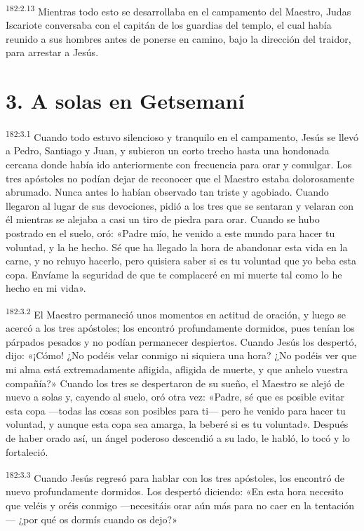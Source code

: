 \par 
\textsuperscript{182:2.13} Mientras todo esto se desarrollaba en el campamento del Maestro, Judas Iscariote conversaba con el capitán de los guardias del templo, el cual había reunido a sus hombres antes de ponerse en camino, bajo la dirección del traidor, para arrestar a Jesús.

\section*{3. A solas en Getsemaní}
\par 
\textsuperscript{182:3.1} Cuando todo estuvo silencioso y tranquilo en el campamento, Jesús se llevó a Pedro, Santiago y Juan, y subieron un corto trecho hasta una hondonada cercana donde había ido anteriormente con frecuencia para orar y comulgar. Los tres apóstoles no podían dejar de reconocer que el Maestro estaba dolorosamente abrumado. Nunca antes lo habían observado tan triste y agobiado. Cuando llegaron al lugar de sus devociones, pidió a los tres que se sentaran y velaran con él mientras se alejaba a casi un tiro de piedra para orar. Cuando se hubo postrado en el suelo, oró: «Padre mío, he venido a este mundo para hacer tu voluntad, y la he hecho. Sé que ha llegado la hora de abandonar esta vida en la carne, y no rehuyo hacerlo, pero quisiera saber si es tu voluntad que yo beba esta copa. Envíame la seguridad de que te complaceré en mi muerte tal como lo he hecho en mi vida».

\par 
\textsuperscript{182:3.2} El Maestro permaneció unos momentos en actitud de oración, y luego se acercó a los tres apóstoles; los encontró profundamente dormidos, pues tenían los párpados pesados y no podían permanecer despiertos. Cuando Jesús los despertó, dijo: «¡Cómo! ¿No podéis velar conmigo ni siquiera una hora? ¿No podéis ver que mi alma está extremadamente afligida, afligida de muerte, y que anhelo vuestra compañía?» Cuando los tres se despertaron de su sueño, el Maestro se alejó de nuevo a solas y, cayendo al suelo, oró otra vez: «Padre, sé que es posible evitar esta copa ---todas las cosas son posibles para ti--- pero he venido para hacer tu voluntad, y aunque esta copa sea amarga, la beberé si es tu voluntad». Después de haber orado así, un ángel poderoso descendió a su lado, le habló, lo tocó y lo fortaleció.

\par 
\textsuperscript{182:3.3} Cuando Jesús regresó para hablar con los tres apóstoles, los encontró de nuevo profundamente dormidos. Los despertó diciendo: «En esta hora necesito que veléis y oréis conmigo ---necesitáis orar aún más para no caer en la tentación--- ¿por qué os dormís cuando os dejo?»


